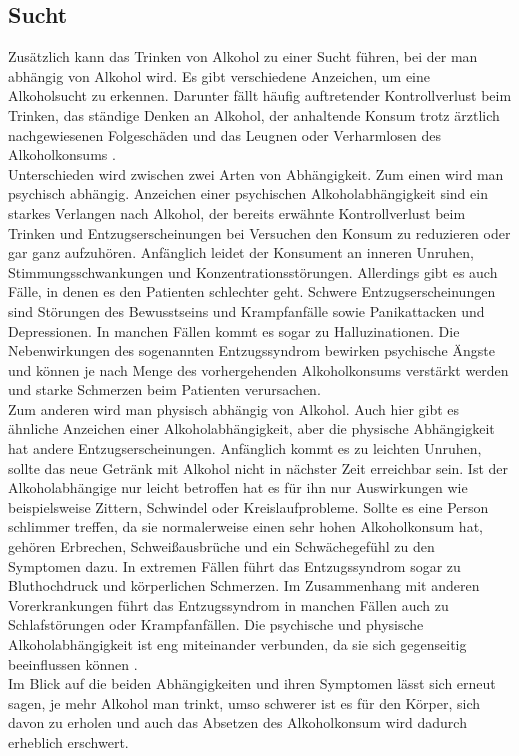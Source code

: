 \documentclass[12pt]{article}
\begin{document}
\subsection{Sucht}                                                                                                                
Zusätzlich kann das Trinken von Alkohol zu einer Sucht führen, bei der man abhängig von Alkohol wird. Es gibt verschiedene Anzeichen, um eine Alkoholsucht zu erkennen. Darunter fällt häufig auftretender Kontrollverlust beim Trinken, das ständige Denken an Alkohol, der anhaltende Konsum trotz ärztlich nachgewiesenen Folgeschäden und das Leugnen oder Verharmlosen des Alkoholkonsums \autocite{burger_bundes-gesundheitssurvey_2003}. \\
Unterschieden wird zwischen zwei Arten von Abhängigkeit. Zum einen wird man psychisch abhängig. Anzeichen einer psychischen Alkoholabhängigkeit sind ein starkes Verlangen nach Alkohol, der bereits erwähnte Kontrollverlust beim Trinken und Entzugserscheinungen bei Versuchen den Konsum zu reduzieren oder gar ganz aufzuhören. Anfänglich leidet der Konsument an inneren Unruhen, Stimmungsschwankungen und Konzentrationsstörungen. Allerdings gibt es auch Fälle, in denen es den Patienten schlechter geht. Schwere Entzugserscheinungen sind Störungen des Bewusstseins und Krampfanfälle sowie Panikattacken und Depressionen. In manchen Fällen kommt es sogar zu Halluzinationen. Die Nebenwirkungen des sogenannten Entzugssyndrom bewirken psychische Ängste und können je nach Menge des vorhergehenden Alkoholkonsums verstärkt werden und starke Schmerzen beim Patienten verursachen.\\
Zum anderen wird man physisch abhängig von Alkohol. Auch hier gibt es ähnliche Anzeichen einer Alkoholabhängigkeit, aber die physische Abhängigkeit hat andere Entzugserscheinungen. Anfänglich kommt es zu leichten Unruhen, sollte das neue Getränk mit Alkohol nicht in nächster Zeit erreichbar sein. Ist der Alkoholabhängige nur leicht betroffen hat es für ihn nur Auswirkungen wie beispielsweise Zittern, Schwindel oder Kreislaufprobleme. Sollte es eine Person schlimmer treffen, da sie normalerweise einen sehr hohen Alkoholkonsum hat, gehören Erbrechen, Schweißausbrüche und ein Schwächegefühl zu den Symptomen dazu. In extremen Fällen führt das Entzugssyndrom sogar zu Bluthochdruck und körperlichen Schmerzen. Im Zusammenhang mit anderen Vorerkrankungen führt das Entzugssyndrom in manchen Fällen auch zu Schlafstörungen oder Krampfanfällen. Die psychische und physische Alkoholabhängigkeit ist eng miteinander verbunden, da sie sich gegenseitig beeinflussen können \autocite{gohring_entzugserscheinungen_2022}. \\
Im Blick auf die beiden Abhängigkeiten und ihren Symptomen lässt sich erneut sagen, je mehr Alkohol man trinkt, umso schwerer ist es für den Körper, sich davon zu erholen und auch das Absetzen des Alkoholkonsum wird dadurch erheblich erschwert. \\
\end{document}
